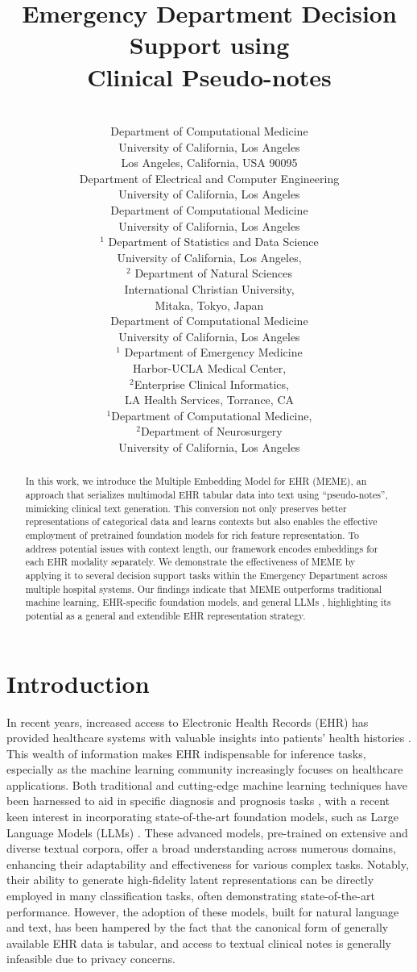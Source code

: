 \documentclass[pmlr]{jmlr}%
\title[Emergency Department Decision Support]{Emergency Department Decision Support using \\Clinical Pseudo-notes}
\author{\Name{Simon A. Lee}
       \Email{simonlee711@g.ucla.edu}\\ 
       \addr Department of Computational Medicine\\
       University of California, Los Angeles\\
       Los Angeles, California, USA 90095 
       \AND
       \Name{Sujay Jain}
       \Email{jainsujay@g.ucla.edu}\\ 
       \addr Department of Electrical and Computer Engineering\\
       University of California, Los Angeles
       \AND
       \Name{Alex Chen}
       \Email{ashchen@g.ucla.edu}\\ 
       \addr Department of Computational Medicine\\
       University of California, Los Angeles
       \AND
       \Name{Kyoka Ono$^{1,2}$}
       \Email{kyokaono8800@g.ucla.edu}\\ 
       \addr$^1$ Department of Statistics and Data Science\\
       University of California, Los Angeles, \\ 
       $^2$ Department of Natural Sciences\\
       International Christian University,\\
       Mitaka, Tokyo, Japan
       \AND
       \Name{Akos Rudas}
       \Email{akosrudas@g.ucla.edu}\\ 
       \addr Department of Computational Medicine\\
       University of California, Los Angeles
       \AND
       \Name{Jennifer Fang$^{1,2}$}
       \Email{jfang@dhs.lacounty.gov}\\ 
       \addr $^1$ Department of Emergency Medicine\\
        Harbor-UCLA Medical Center,\\
        $^2$Enterprise Clinical Informatics, \\ LA Health Services, Torrance, CA
       \AND
       \Name{Jeffrey N. Chiang$^{1,2}$}
       \Email{njchiang@g.ucla.edu}\\ 
       \addr $^1$Department of Computational Medicine,\\
       $^2$Department of Neurosurgery \\
       University of California, Los Angeles}
\begin{document}
\maketitle
\vspace*{-1cm}
\begin{abstract}
In this work, we introduce the Multiple Embedding Model for EHR (MEME), an approach that serializes multimodal EHR tabular data into text using ``pseudo-notes'', mimicking clinical text generation. This conversion not only preserves better representations of categorical data and learns contexts but also enables the effective employment of pretrained foundation models for rich feature representation. To address potential issues with context length, our framework encodes embeddings for each EHR modality separately. We demonstrate the effectiveness of MEME by applying it to several {decision support} tasks within the Emergency Department across multiple hospital systems. Our findings indicate that MEME outperforms {traditional machine learning, EHR-specific foundation models, and general LLMs} {, highlighting its potential as a general and extendible EHR representation strategy.} 
\end{abstract}

\section{Introduction}
In recent years, increased access to Electronic Health Records (EHR) has provided healthcare systems with valuable insights into patients' health histories \citep{idowu2023streams}. This wealth of information makes EHR indispensable for inference tasks, especially as the machine learning community increasingly focuses on healthcare applications. Both traditional and cutting-edge machine learning techniques have been harnessed to aid in specific diagnosis and prognosis tasks \citep{shickel_deep_2018}, with a recent keen interest in incorporating state-of-the-art foundation models, such as Large Language Models (LLMs) \citep{zhao_survey_2023}. These advanced models, pre-trained on extensive and diverse textual corpora, offer a broad understanding across numerous domains, enhancing their adaptability and effectiveness for various complex tasks. Notably, their ability to generate high-fidelity latent representations can be directly employed in many classification tasks, often demonstrating state-of-the-art performance. However, the adoption of these models, built for natural language and text, has been hampered by the fact that the canonical form of generally available EHR data is tabular, and access to textual clinical notes is generally infeasible due to privacy concerns.
\end{document}
